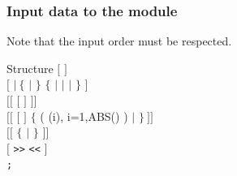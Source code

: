 \clearpage

\vskip 0.2cm
\subsubsection{Input data to the  module}\label{sect:strtinst}

\noindent
Note that the input order must be respected. \\

\begin{DataStructure}{Structure }
$[$   $]$ \\
$[$    $|~\{$  $|$  $\}$  $\{$  $|$  $|$  $|$  $\}$ $]$ \\
$[[$  $[$  $]$    $]]$ \\
$[[$  $[$  $]$    $\{$ 
( (i), i=1,ABS() ) $|$   $\}~]]$ \\
$[[$     
$\{$  $|$  $\}$ $]]$ \\
$[$   {\tt >>}  {\tt <<} $]$ \\
{\tt ;}
\end{DataStructure}


